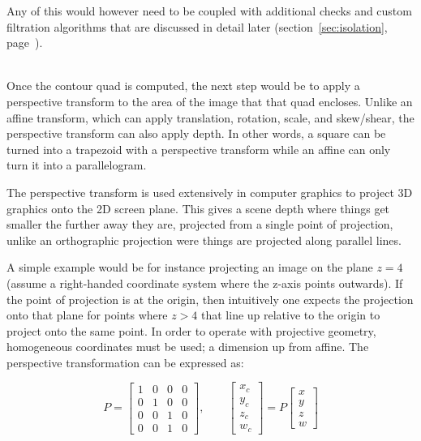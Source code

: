 \documentclass[a4paper,12pt,notitlepage]{article}
\newcommand{\secref}[1]{(section~\ref{#1}, page~\pageref{#1})}
\begin{document}
			Any of this would however need to be coupled with additional checks and custom filtration algorithms that are discussed in detail later \secref{sec:isolation}.

			~\\

			Once the contour quad is computed, the next step would be to apply a perspective transform to the area of the image that that quad encloses. Unlike an affine transform, which can apply translation, rotation, scale, and skew/shear, the perspective transform can also apply depth. In other words, a square can be turned into a trapezoid with a perspective transform while an affine can only turn it into a parallelogram.

			The perspective transform is used extensively in computer graphics to project 3D graphics onto the 2D screen plane. This gives a scene depth where things get smaller the further away they are, projected from a single point of projection, unlike an orthographic projection were things are projected along parallel lines.

			A simple example would be for instance projecting an image on the plane $z = 4$ (assume a right-handed coordinate system where the z-axis points outwards). If the point of projection is at the origin, then intuitively one expects the projection onto that plane for points where $z > 4$ that line up relative to the origin to project onto the same point. In order to operate with projective geometry, homogeneous coordinates must be used; a dimension up from affine. The perspective transformation can be expressed as:

			\begin{equation}
				P =
				\begin{bmatrix}
					1 & 0 & 0 & 0\\
					0 & 1 & 0 & 0\\
					0 & 0 & 1 & 0\\
					0 & 0 & 1 & 0
				\end{bmatrix},\qquad
				\begin{bmatrix}
					x_c\\
					y_c\\
					z_c\\
					w_c
				\end{bmatrix}
				= P
				\begin{bmatrix}
					x\\
					y\\
					z\\
					w
				\end{bmatrix}
			\end{equation}
\end{document}
